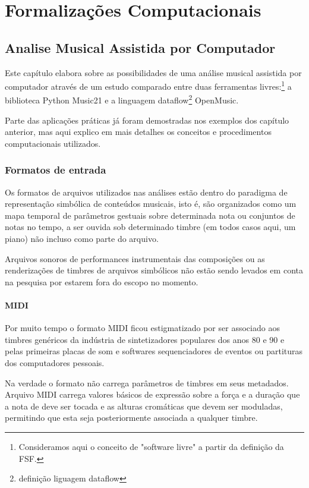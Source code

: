 \documentclass[
	12pt,				%
	openright,			%
	twoside,			%
	a4paper,			%
	english,			%
	french,				%
	spanish,			%
	brazil				%
	]{abntex2}
\begin{document}
\part{Formalizações Computacionais}


\chapter{Analise Musical Assistida por Computador}
\label{analise_computacional}

Este capítulo elabora sobre as possibilidades de uma análise musical assistida por computador através de um estudo comparado entre duas ferramentas livres:\footnote{Consideramos aqui o conceito de "software livre" a partir da definição da FSF.} a biblioteca Python Music21 e a linguagem dataflow\footnote{definição liguagem dataflow} OpenMusic.

Parte das aplicações práticas já foram demostradas nos exemplos dos capítulo anterior, mas aqui explico em mais detalhes os conceitos e procedimentos computacionais utilizados.


\section{Formatos de entrada}


Os formatos de arquivos utilizados nas análises estão dentro do paradigma de representação simbólica de conteúdos musicais, isto é, são organizados como um mapa temporal de parâmetros gestuais sobre determinada nota ou conjuntos de notas no tempo, a ser ouvida sob determinado timbre (em todos casos aqui, um piano) não incluso como parte do arquivo. 

Arquivos sonoros de performances instrumentais das composições ou as renderizações de timbres de arquivos simbólicos não estão sendo levados em conta na pesquisa por estarem fora do escopo no momento.



\subsection{MIDI}

Por muito tempo o formato MIDI ficou estigmatizado por ser associado aos timbres genéricos da indústria de sintetizadores populares dos anos 80 e 90 e pelas primeiras placas de som e softwares sequenciadores de eventos ou partituras dos computadores pessoais. 

Na verdade o formato não carrega parâmetros de timbres em seus metadados. Arquivo MIDI carrega valores básicos de expressão sobre a força e a duração que a nota de deve ser tocada e as alturas cromáticas que devem ser moduladas, permitindo que esta seja posteriormente associada a qualquer timbre.
\end{document}
